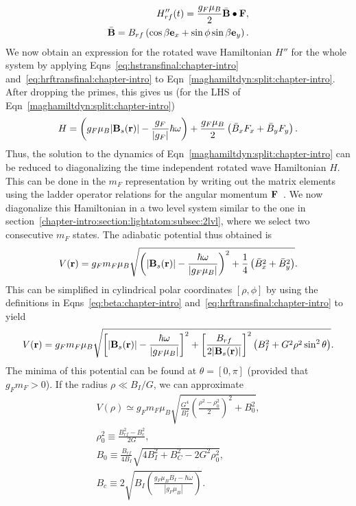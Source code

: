 \begin{eqnarray}
H''_{rf}(t) = \frac{g_F \mu_B}{2} \bar{{\bf B}} \bullet {\bf F}, \nonumber \\
\bar{{\bf B}} = B_{rf} \left( \cos{\beta} {\bf e}_x + \sin{\phi}\sin{\beta}{\bf e}_y \right).
\label{eq:hrftransfinal:chapter-intro}
\end{eqnarray}
We now obtain an expression for the rotated wave Hamiltonian $H''$ for the whole system by applying Eqns~\ref{eq:hstransfinal:chapter-intro} and~\ref{eq:hrftransfinal:chapter-intro} to Eqn~\ref{maghamiltdyn:split:chapter-intro}. After dropping the primes, this gives us (for the LHS of Eqn~\ref{maghamiltdyn:split:chapter-intro})
\begin{equation}
H= \left( g_F  \mu_B |{\bf B}_s({\bf r})| -\frac{g_F}{|g_F|} \hbar \omega   \right) + \frac{g_F \mu_B}{2} \left(\bar{B}_x F_x + \bar{B}_y F_y  \right).
\label{maghamilt:rwa:chapter-intro}
\end{equation}
Thus, the solution to the dynamics of Eqn~\ref{maghamiltdyn:split:chapter-intro} can be reduced to diagonalizing the time independent rotated wave Hamiltonian $H$. This can be done in the $m_F$ representation by writing out the matrix elements using the ladder     
operator relations for the angular momentum ${\bf F}$~\cite{sakurai}. We now diagonalize this Hamiltonian in a two level system similar to the one in section~\ref{chapter-intro:section:lightatom:subsec:2lvl}, where we select two consecutive $m_F$ states. The adiabatic potential thus obtained is~\cite{lesanovsky:maghamilt}
\begin{equation}
V({\bf r}) = g_F m_F \mu_B \sqrt{\left( |{\bf B}_s({\bf r})|-\frac{\hbar \omega}{|g_F \mu_B|} \right)^2+ \frac{1}{4} \left( \bar{B}_x^2 + \bar{B}_y^2 \right)}.
\end{equation}
This can be simplified in cylindrical polar coordinates $\left[\rho, \phi \right]$ by using the definitions in Eqns~\ref{eq:beta:chapter-intro} and~\ref{eq:hrftransfinal:chapter-intro} to yield
\begin{equation}
V({\bf r}) = g_F m_F \mu_B \sqrt{\left[ |{\bf B}_s({\bf r})|-\frac{\hbar \omega}{|g_F \mu_B|} \right]^2 + \left[\frac{B_{rf}}{2|{\bf B}_s({\bf r})|} \right]^2 \left( B^2_I +G^2 \rho^2 \sin^2\theta \right)}.
\end{equation}
The minima of this potential can be found at $\theta = \left[0, \pi \right]$ (provided that $g_F m_F >0$). If the radius $\rho \ll B_I/G$, we can approximate
\begin{eqnarray}
V(\rho) \simeq g_F m_F \mu_B \sqrt{\frac{G^4}{B^2_I}\left(\frac{\rho^2-\rho^2_0}{2} \right)^2+B^2_0}, \nonumber \\
\rho^2_0 \equiv \frac{B^2_{rf}-B^2_c}{2G}, \nonumber \\
B_0 \equiv \frac{B_{rf}}{4B_I}\sqrt{4B^2_I + B^2_C -2 G^2\rho^2_0}, \nonumber \\
B_c \equiv 2\sqrt{B_I \left( \frac{g_F\mu_B B_I -\hbar\omega}{|g_F\mu_B|}\right)}.
\label{eq:magpot:chapter-intro}
\end{eqnarray}

